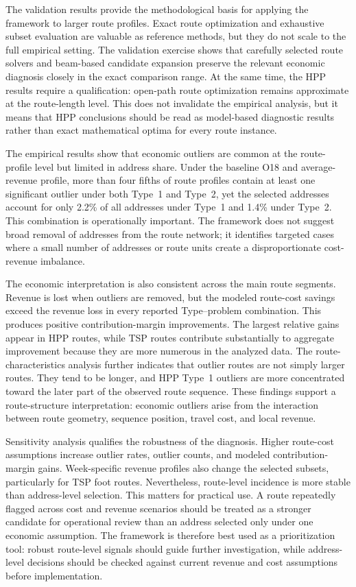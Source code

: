 \documentclass[preprint,12pt]{elsarticle}
\begin{document}
The validation results provide the methodological basis for applying the framework to larger route profiles. Exact route optimization and exhaustive subset evaluation are valuable as reference methods, but they do not scale to the full empirical setting. The validation exercise shows that carefully selected route solvers and beam-based candidate expansion preserve the relevant economic diagnosis closely in the exact comparison range. At the same time, the HPP results require a qualification: open-path route optimization remains approximate at the route-length level. This does not invalidate the empirical analysis, but it means that HPP conclusions should be read as model-based diagnostic results rather than exact mathematical optima for every route instance.

The empirical results show that economic outliers are common at the route-profile level but limited in address share. Under the baseline O18 and average-revenue profile, more than four fifths of route profiles contain at least one significant outlier under both Type~1 and Type~2, yet the selected addresses account for only 2.2\% of all addresses under Type~1 and 1.4\% under Type~2. This combination is operationally important. The framework does not suggest broad removal of addresses from the route network; it identifies targeted cases where a small number of addresses or route units create a disproportionate cost-revenue imbalance.

The economic interpretation is also consistent across the main route segments. Revenue is lost when outliers are removed, but the modeled route-cost savings exceed the revenue loss in every reported Type--problem combination. This produces positive contribution-margin improvements. The largest relative gains appear in HPP routes, while TSP routes contribute substantially to aggregate improvement because they are more numerous in the analyzed data. The route-characteristics analysis further indicates that outlier routes are not simply larger routes. They tend to be longer, and HPP Type~1 outliers are more concentrated toward the later part of the observed route sequence. These findings support a route-structure interpretation: economic outliers arise from the interaction between route geometry, sequence position, travel cost, and local revenue.

Sensitivity analysis qualifies the robustness of the diagnosis. Higher route-cost assumptions increase outlier rates, outlier counts, and modeled contribution-margin gains. Week-specific revenue profiles also change the selected subsets, particularly for TSP foot routes. Nevertheless, route-level incidence is more stable than address-level selection. This matters for practical use. A route repeatedly flagged across cost and revenue scenarios should be treated as a stronger candidate for operational review than an address selected only under one economic assumption. The framework is therefore best used as a prioritization tool: robust route-level signals should guide further investigation, while address-level decisions should be checked against current revenue and cost assumptions before implementation.
\end{document}
